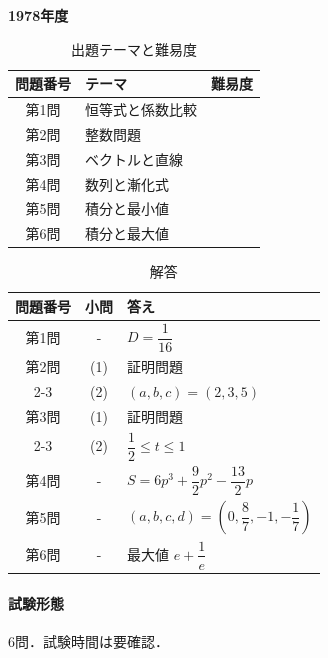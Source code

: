 \documentclass[../../main.tex]{subfiles}
\begin{document}
\begin{center}
  {\fontsize{48pt}{58pt}\selectfont \textbf{1978}\normalsize\textbf{年度}}
\end{center}

\begin{table}[htb]
  \centering
  \caption{出題テーマと難易度}
  \begin{tabular}{|c|p{9cm}|c|}
    \hline
    \textbf{問題番号} & \textbf{テーマ} & \textbf{難易度} \\
    \hline
    第1問 & 恒等式と係数比較 & \\
    \hline
    第2問 & 整数問題 & \\
    \hline
    第3問 & ベクトルと直線 & \\
    \hline
    第4問 & 数列と漸化式 & \\
    \hline
    第5問 & 積分と最小値 & \\
    \hline
    第6問 & 積分と最大値 & \\
    \hline
  \end{tabular}
\end{table}

\begin{table}[htb]
  \centering
  \caption{解答}
  \renewcommand{\arraystretch}{1.4}
  \begin{tabular}{|c|c|p{9cm}|}
    \hline
    \textbf{問題番号} & \textbf{小問} & \textbf{答え} \\
    \hline
    第1問 & - & $D=\dfrac{1}{16}$ \\
    \hline
    第2問 & (1) & 証明問題 \\
    \cline{2-3}
    & (2) & $(a,b,c)=(2,3,5)$ \\
    \hline
    第3問 & (1) & 証明問題 \\
    \cline{2-3}
    & (2) & $\dfrac{1}{2}\le t\le1$ \\
    \hline
    第4問 & - & $S=6p^3+\dfrac{9}{2}p^2-\dfrac{13}{2}p$ \\
    \hline
    第5問 & - & $(a,b,c,d)=\left(0,\dfrac{8}{7},-1,-\dfrac{1}{7}\right)$ \\
    \hline
    第6問 & - & 最大値 $e+\dfrac{1}{e}$ \\
    \hline
  \end{tabular}
\end{table}

\paragraph{試験形態}
6問．試験時間は要確認．
\end{document}
